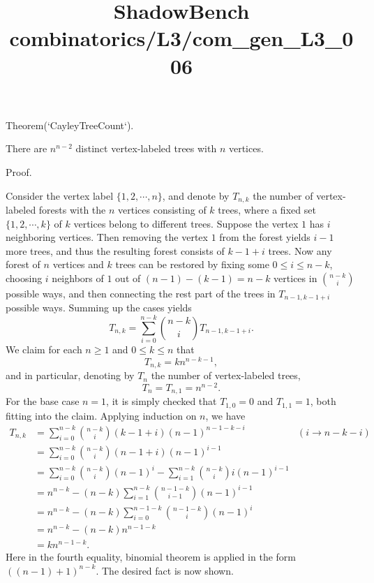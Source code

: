 \documentclass{article}
\title{ShadowBench combinatorics/L3/com\_gen\_L3\_006}
\begin{document}
\maketitle

Theorem(`CayleyTreeCount`).

There are $n^{n-2}$ distinct vertex-labeled trees with $n$ vertices.

Proof.

Consider the vertex label $\{1, 2, \cdots, n\}$, and denote by $T_{n, k}$ the number of vertex-labeled forests with the $n$ vertices consisting of $k$ trees, where a fixed set $\{1, 2, \cdots, k\}$ of $k$ vertices belong to different trees.
Suppose the vertex $1$ has $i$ neighboring vertices. Then removing the vertex $1$ from the forest yields $i-1$ more trees, and thus the resulting forest consists of $k-1+i$ trees. Now any forest of $n$ vertices and $k$ trees can be restored by fixing some $0 \le i \le n - k$, choosing $i$ neighbors of $1$ out of $(n-1)-(k-1) = n-k$ vertices in $\binom{n-k}{i}$ possible ways, and then connecting the rest part of the trees in $T_{n-1, k-1+i}$ possible ways. Summing up the cases yields
$$
T_{n, k} = \sum_{i=0}^{n-k} \binom{n-k}{i} T_{n-1, k-1+i}.
$$
We claim for each $n \ge 1$ and $0 \le k \le n$ that
$$
T_{n,k} = kn^{n-k-1},
$$
and in particular, denoting by $T_n$ the number of vertex-labeled trees,
$$
T_n = T_{n, 1} = n^{n-2}.
$$
For the base case $n = 1$, it is simply checked that $T_{1,0} = 0$ and $T_{1,1} = 1$, both fitting into the claim. Applying induction on $n$, we have
$$
\begin{align}
T_{n,k}
&= \sum_{i=0}^{n-k} \binom{n-k}{i} (k-1+i) (n-1)^{n-1-k-i} & (i \to n - k - i)\\
&= \sum_{i=0}^{n-k} \binom{n-k}{i} (n-1+i) (n-1)^{i-1}  \\
&= \sum_{i=0}^{n-k} \binom{n-k}{i} (n-1)^i - \sum_{i=1}^{n-k} \binom{n-k}{i} i(n-1)^{i-1}\\
&= n^{n-k} - (n-k) \sum_{i=1}^{n-k} \binom{n-1-k}{i-1} (n-1)^{i-1} \\
&= n^{n-k} - (n-k) \sum_{i=0}^{n-1-k} \binom{n-1-k}{i} (n-1)^i \\
&= n^{n-k} - (n-k) n^{n-1-k} \\
&= k n^{n-1-k}.
\end{align}
$$
Here in the fourth equality, binomial theorem is applied in the form $((n-1)+1)^{n-k}$. The desired fact is now shown.
\end{document}
